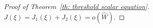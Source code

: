 \documentclass[11pt,a4paper]{article}
\numberwithin{equation}{section}
\numberwithin{figure}{section}
\newcommand\beaa{\begin{eqnarray*}}
\newcommand\eeaa{\end{eqnarray*}}
\begin{document}
\begin{proof}[Proof of Theorem~\ref{th: threshold scalar equation}]

$J(\xi)=J_1(\xi)+J_2(\xi)=o(\widehat{W})$.


\end{proof}
\end{document}
